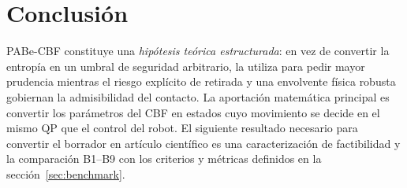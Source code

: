 \documentclass[10pt,a4paper,twocolumn]{article}
\begin{document}
\section{Conclusión}
PABe-CBF constituye una \emph{hipótesis teórica estructurada}: en vez de convertir la entropía en un umbral de seguridad arbitrario, la utiliza para pedir mayor prudencia mientras el riesgo explícito de retirada y una envolvente física robusta gobiernan la admisibilidad del contacto. La aportación matemática principal es convertir los parámetros del CBF en estados cuyo movimiento se decide en el mismo QP que el control del robot. El siguiente resultado necesario para convertir el borrador en artículo científico es una caracterización de factibilidad y la comparación B1--B9 con los criterios y métricas definidos en la sección~\ref{sec:benchmark}.

\clearpage
\onecolumn
\end{document}
